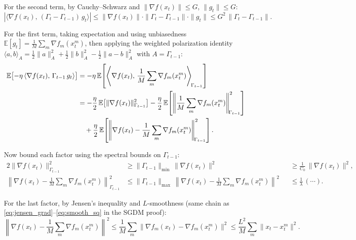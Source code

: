 \documentclass{article}
\begin{document}
For the second term, by Cauchy--Schwarz and
$\|\nabla f(x_t)\| \leq G$, $\|g_t\| \leq G$:
\begin{equation}
|\langle \nabla f(x_t),\, (\Gamma_t - \Gamma_{t-1})\,g_t \rangle|
\leq \|\nabla f(x_t)\| \cdot \|\Gamma_t - \Gamma_{t-1}\| \cdot \|g_t\|
\leq G^2\,\|\Gamma_t - \Gamma_{t-1}\|.
\label{eq:adam_I_perturb}
\end{equation}

For the first term, taking expectation and using unbiasedness
$\mathbb{E}[g_t] = \frac{1}{M}\sum_m \nabla f_m(x_t^m)$, then applying the
weighted polarization identity
$\langle a,b \rangle_A = \frac{1}{2}\|a\|_A^2 + \frac{1}{2}\|b\|_A^2
- \frac{1}{2}\|a-b\|_A^2$ with $A = \Gamma_{t-1}$:
\begin{align}
\mathbb{E}\bigl[-\eta\,\langle \nabla f(x_t),\,
\Gamma_{t-1}\,g_t \rangle\bigr]
&= -\eta\,\mathbb{E}\!\left[\left\langle \nabla f(x_t),\,
   \frac{1}{M}\sum_m \nabla f_m(x_t^m)
   \right\rangle_{\!\Gamma_{t-1}}\right] \notag \\
&= -\frac{\eta}{2}\,\mathbb{E}\bigl[\|\nabla f(x_t)\|_{\Gamma_{t-1}}^2\bigr]
   - \frac{\eta}{2}\,\mathbb{E}\!\left[\left\|
   \frac{1}{M}\sum_m \nabla f_m(x_t^m)
   \right\|_{\!\Gamma_{t-1}}^2\right] \notag \\
&\quad+ \frac{\eta}{2}\,\mathbb{E}\!\left[\left\|
   \nabla f(x_t) - \frac{1}{M}\sum_m \nabla f_m(x_t^m)
   \right\|_{\!\Gamma_{t-1}}^2\right].
\label{eq:adam_I_polar}
\end{align}

Now bound each factor using the spectral bounds on $\Gamma_{t-1}$:
\begin{alignat}{2}
\|\nabla f(x_t)\|_{\Gamma_{t-1}}^2
&\geq \|\Gamma_{t-1}\|_{\min}\,\|\nabla f(x_t)\|^2
&&\geq \frac{1}{C_0}\,\|\nabla f(x_t)\|^2,
\label{eq:adam_I_lower} \\
\left\|\nabla f(x_t) - \tfrac{1}{M}\sum_m\nabla f_m(x_t^m)
\right\|_{\!\Gamma_{t-1}}^2
&\leq \|\Gamma_{t-1}\|_{\max}\,\left\|\nabla f(x_t)
- \tfrac{1}{M}\sum_m\nabla f_m(x_t^m)\right\|^2
&&\leq \frac{1}{\lambda}\,(\cdots).
\label{eq:adam_I_upper}
\end{alignat}

For the last factor, by Jensen's inequality and $L$-smoothness (same chain as
\eqref{eq:jensen_grad}--\eqref{eq:smooth_sq} in the SGDM proof):
\begin{equation}
\left\|\nabla f(x_t) - \frac{1}{M}\sum_m\nabla f_m(x_t^m)\right\|^2
\leq \frac{1}{M}\sum_m \|\nabla f_m(x_t) - \nabla f_m(x_t^m)\|^2
\leq \frac{L^2}{M}\sum_m \|x_t - x_t^m\|^2.
\label{eq:adam_I_jensen}
\end{equation}
\end{document}
